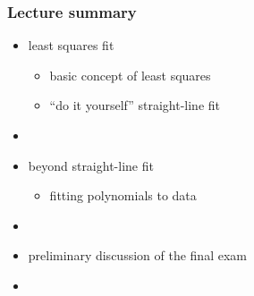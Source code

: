 \documentclass[english,14pt]{beamer}
\begin{document}

\begin{frame}[fragile]

\frametitle{Lecture summary}
\begin{itemize}
	\item least squares fit
	\begin{itemize}
		\item basic concept of least squares
		\item ``do it yourself'' straight-line fit
	\end{itemize}
	\item[]
	
	\item beyond straight-line fit
	\begin{itemize}
		\item fitting polynomials to data
	\end{itemize}
	\item[]
	
	\item preliminary discussion of the final exam
	\item[]
	
\end{itemize}

\end{frame}
\end{document}
